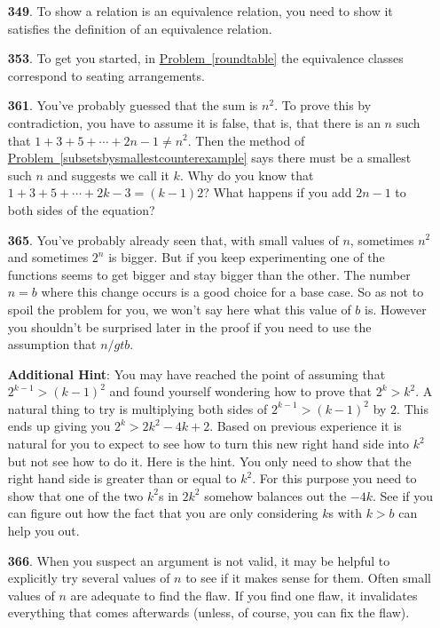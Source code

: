 \documentclass[10pt,]{book}
\theoremstyle{plain}
\theoremstyle{definition}
\theoremstyle{definition}
\numberwithin{equation}{chapter}
\newcommand{\gt}{>}
\begin{document}
\begin{itemize}[itemsep=1em]
\item[\textbf{349}.]To show a relation is an equivalence relation, you need to show it satisfies the definition of an equivalence relation.%

\item[\textbf{353}.]To get you started, in \hyperref[roundtable]{Problem~\ref{roundtable}} the equivalence classes correspond to seating arrangements.%

\item[\textbf{361}.]You've probably guessed that the sum is \(n^2\). To prove this by contradiction, you have to assume it is false, that is, that there is an \(n\) such that \(1 + 3 + 5 + \cdots + 2n - 1 \ne n^2\). Then the method of \hyperref[subsetsbysmallestcounterexample]{Problem~\ref{subsetsbysmallestcounterexample}} says there must be a smallest such \(n\) and suggests we call it \(k\). Why do you know that \(1 + 3 + 5 + \cdots + 2k - 3 = (k-1)2\)? What happens if you add \(2n-1\) to both  sides of the equation?%

\item[\textbf{365}.]You've probably already seen that, with small values of \(n\), sometimes \(n^2\) and sometimes \(2^n\) is bigger. But if you keep experimenting one of the functions  seems to get bigger and stay bigger than the other. The number \(n=b\) where this change occurs is a good choice for a base case. So as not to spoil the problem for you, we won't say here what this value of \(b\) is. However you    shouldn't be surprised later in the proof if you need to use the assumption that \(n /gt b\).%

\par\smallskip
\noindent\textbf{Additional Hint}: You may have reached the point of assuming that \(2^{k-1} \gt (k-1)^2\) and found yourself wondering how to prove that \(2^k \gt k^2\). A natural thing to try is multiplying both sides of \(2^{k-1} \gt (k-1)^2\) by \(2\). This ends up giving you \(2^k \gt 2k^2 - 4k +2\). Based on previous experience it is natural for you to expect to see how to turn this new right hand side into \(k^2\) but not see how to do it. Here is the hint. You only need to show that the right hand side is greater than or equal to \(k^2\). For this purpose you need to show that one of the two \(k^2\)s in \(2k^2\) somehow balances out the \(-4k\). See if you can figure out how the fact that you are only considering \(k\)s with \(k \gt b\) can help you out.%

\item[\textbf{366}.]When you suspect an argument is not valid, it may be helpful to explicitly try several values of \(n\) to see if it makes sense for them. Often small values of \(n\) are adequate to find the flaw. If you find one flaw, it invalidates everything that comes afterwards (unless, of course, you can fix the flaw).%


\end{itemize}
\end{document}
